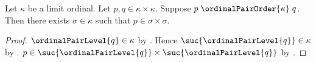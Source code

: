 \begin{corollary}\label{ordinal_pair_predecessor_bound_in_limit}
    Let $\kappa$ be a limit ordinal.
    Let $p,q\in\kappa\times\kappa$.
    Suppose $p\mathrel{\ordinalPairOrder{\kappa}}q$.
    Then there exists $\sigma\in\kappa$ such that
        $p\in\sigma\times\sigma$.
\end{corollary}
\begin{proof}
    $\ordinalPairLevel{q}\in\kappa$
        by .
    Hence $\suc{\ordinalPairLevel{q}}\in\kappa$
        by .
    $p\in\suc{\ordinalPairLevel{q}}
        \times\suc{\ordinalPairLevel{q}}$
        by .
\end{proof}
